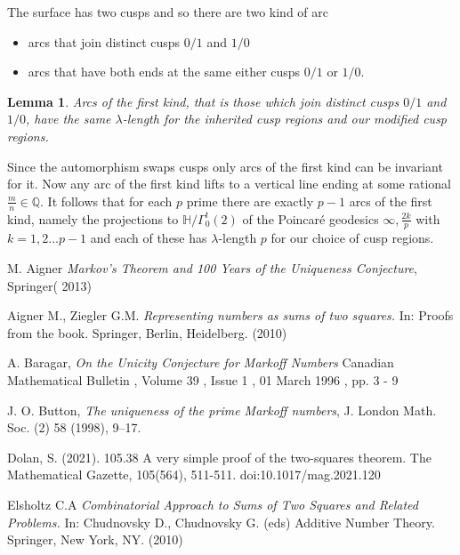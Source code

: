 \documentclass[12pt,a4paper]{amsart}
\newtheorem{lem}[thm]{Lemma}
\def\HH{\mathbb{H}}
\def\ah{\Gamma_0^t(2)}
\def\oot{\HH / \ah}
\def\QQ{\mathbb{Q}}
\begin{document}
The surface has two cusps and so there are two kind of arc
\begin{itemize}
	\item arcs that join distinct cusps $0/1$ and $1/0$
	\item arcs that have both ends at the same either
		cusps $0/1$ or $1/0$.
\end{itemize}

\begin{lem}
Arcs of the first kind,
that is those which join distinct cusps $0/1$ and $1/0$,
have the same $\lambda$-length for the inherited
cusp regions and our modified cusp regions. 
\end{lem}


Since the automorphism swaps cusps only arcs of the first  kind can be invariant for it.
Now any arc of the first kind lifts to a vertical line ending at
some rational $\frac{m}{n}\in \QQ$.
It follows that for each  $p$  prime there are exactly $p-1$ arcs of the first kind,
namely the projections to $\oot$ of the Poincaré geodesics  $\infty,
\frac{2k}{p}$ with  $k = 1,2\ldots p-1$
and each of these has $\lambda$-length $p$ for our choice of cusp regions.



M. Aigner
\textit{Markov's Theorem and 100 Years of the Uniqueness Conjecture}, Springer( 2013)

Aigner M., Ziegler G.M.  
\textit{Representing numbers as sums of two squares.} In: Proofs from the book. Springer, Berlin, Heidelberg. (2010)

A. Baragar,
\textit{On the Unicity Conjecture for Markoff Numbers}
Canadian Mathematical Bulletin , Volume 39 , Issue 1 , 01 March 1996 , pp. 3 - 9

J. O. Button, 
\textit{The uniqueness of the prime Markoff numbers},
 J. London Math. Soc.
(2) 58 (1998), 9–17.


Dolan, S. (2021). 105.38 A very simple proof of the two-squares theorem. The Mathematical Gazette, 105(564), 511-511. doi:10.1017/mag.2021.120

Elsholtz C.A 
\textit{Combinatorial Approach to Sums of Two Squares and Related Problems.}
 In: Chudnovsky D., Chudnovsky G. (eds) Additive Number Theory. Springer, New York, NY.
 (2010) 
\end{document}
